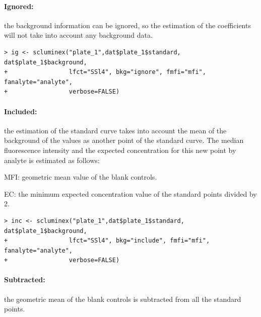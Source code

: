 \documentclass[11pt]{article}\usepackage[]{graphicx}\usepackage[]{color}
\makeatletter
\newenvironment{kframe}{%
 \def\at@end@of@kframe{}%
 \ifinner\ifhmode%
  \def\at@end@of@kframe{\end{minipage}}%
  \begin{minipage}{\columnwidth}%
 \fi\fi%
 \def\FrameCommand##1{\hskip\@totalleftmargin \hskip-\fboxsep
 \colorbox{shadecolor}{##1}\hskip-\fboxsep
     \hskip-\linewidth \hskip-\@totalleftmargin \hskip\columnwidth}%
 \MakeFramed {\advance\hsize-\width
   \@totalleftmargin\z@ \linewidth\hsize
   \@setminipage}}%
 {\par\unskip\endMakeFramed%
 \at@end@of@kframe}
\newenvironment{knitrout}{}{} %
\newenvironment{itemize*}%
    {\begin{itemize}%
        \setlength{\itemsep}{-0.35cm}%
        \setlength{\parskip}{10pt}}%
{\end{itemize}}
\makeatother
\begin{document}
\paragraph{Ignored:} the background 
information can be ignored, so the estimation of the coefficients will 
not take into account any background data.

\begin{knitrout}
\color{fgcolor}\begin{kframe}
\begin{verbatim}
> ig <- scluminex("plate_1",dat$plate_1$standard, dat$plate_1$background, 
+                 lfct="SSl4", bkg="ignore", fmfi="mfi", fanalyte="analyte", 
+                 verbose=FALSE)
\end{verbatim}
\end{kframe}
\end{knitrout}


\paragraph{Included:} the estimation of the standard curve takes 
into account the mean of the background of the values as another 
point of the standard curve. The median fluorescence 
intensity and the expected concentration for this new point by  
analyte is estimated as follows:

\begin{itemize*}
    \item MFI: geometric mean value of the blank controls.
    \item EC: the minimum expected concentration value of the standard points 
divided by 2.
\end{itemize*}


\begin{knitrout}
\color{fgcolor}\begin{kframe}
\begin{verbatim}
> inc <- scluminex("plate_1",dat$plate_1$standard, dat$plate_1$background, 
+                 lfct="SSl4", bkg="include", fmfi="mfi", fanalyte="analyte", 
+                 verbose=FALSE)
\end{verbatim}
\end{kframe}
\end{knitrout}


\paragraph{Subtracted:} the geometric mean of the blank controls is subtracted 
from all the standard points.
\end{document}
